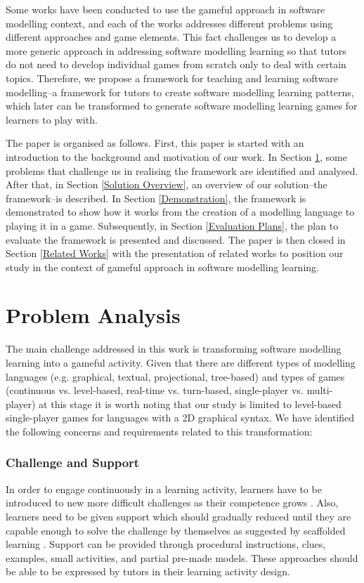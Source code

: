 \documentclass[conference]{IEEEtran}
\begin{document}
Some works \cite{Stikkolorum2014, Groenewegen2010, Ionita2015, Richardsen2014} have been conducted to use the gameful approach in software modelling context, and each of the works addresses different problems using different approaches and game elements. This fact challenges us to develop a more generic approach in addressing software modelling learning so that tutors do not need to develop individual games from scratch only to deal with certain topics. Therefore, we propose a framework for teaching and learning software modelling--a framework for tutors to create software modelling learning patterns, which later can be transformed to generate software modelling learning games for learners to play with.

The paper is organised as follows. First, this paper is started with an introduction to the background and motivation of our work. In Section \ref{Problem Analysis}, some problems that challenge us in realising the framework are identified and analysed. After that, in Section \ref{Solution Overview}, an overview of our solution--the framework--is described. In Section \ref{Demonstration}, the framework is demonstrated to show how it works from the creation of a modelling language to playing it in a game. Subsequently, in Section \ref{Evaluation Plans}, the plan to evaluate the framework is presented and discussed. The paper is then closed in Section \ref{Related Works} with the presentation of related works to position our study in the context of gameful approach in software modelling learning. 

\section{Problem Analysis}
\label{Problem Analysis}
The main challenge addressed in this work is transforming software modelling learning into a gameful activity. Given that there are different types of modelling languages (e.g. graphical, textual, projectional, tree-based) and types of games (continuous vs. level-based, real-time vs. turn-based, single-player vs. multi-player) at this stage it is worth noting that our study is limited to level-based single-player games for languages with a 2D graphical syntax. We have identified the following concerns and requirements related to this transformation:

\subsubsection{Challenge and Support}
In order to engage continuously in a learning activity, learners have to be introduced to new more difficult challenges as their competence grows \cite{csikszentmihalyi2014toward}. Also, learners need to be given support which should gradually reduced until they are capable enough to solve the challenge by themselves as suggested by scaffolded learning \cite{wood1976role, vygotsky1978mind}. Support can be provided through procedural instructions, clues, examples, small activities, and partial pre-made models. These approaches should be able to be expressed by tutors in their learning activity design. 
\end{document}
